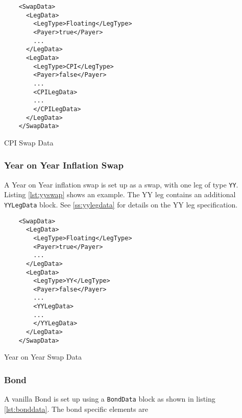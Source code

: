 \begin{listing}[H]
\begin{verbatim}
    <SwapData>
      <LegData>
        <LegType>Floating</LegType>
        <Payer>true</Payer>
        ...
      </LegData>
      <LegData>
        <LegType>CPI</LegType>
        <Payer>false</Payer>
        ...
        <CPILegData>
        ...
        </CPILegData>
      </LegData>
    </SwapData>
\end{verbatim}
\caption{CPI Swap Data}
\label{lst:cpiswap}
\end{listing}

\subsubsection{Year on Year Inflation Swap}

A Year on Year inflation swap is set up as a swap, with one leg of type {\tt YY}. Listing \ref{lst:yyswap} shows an
example. The YY leg contains an additional {\tt YYLegData} block. See \ref{ss:yylegdata} for details on the YY leg
specification.

\begin{listing}[H]
\begin{verbatim}
    <SwapData>
      <LegData>
        <LegType>Floating</LegType>
        <Payer>true</Payer>
        ...
      </LegData>
      <LegData>
        <LegType>YY</LegType>
        <Payer>false</Payer>
        ...
        <YYLegData>
        ...
        </YYLegData>
      </LegData>
    </SwapData>
\end{verbatim}
\caption{Year on Year Swap Data}
\label{lst:yyswap}
\end{listing}

\subsubsection{Bond}

A vanilla Bond is set up using a {\tt BondData} block as shown in listing \ref{lst:bonddata}. The bond specific elements
are

